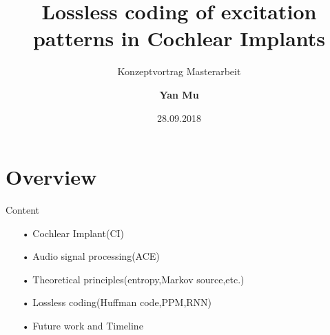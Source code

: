 \documentclass[notes=hide]{beamer}
\title{Lossless coding of excitation patterns in Cochlear Implants}
\author[Yan Mu, B.Eng.]{\textbf{Yan Mu}}
\subtitle{Konzeptvortrag Masterarbeit}
\institute{Institut für Informationsverarbeitung\\ Leibniz Universität Hannover}
\date{28.09.2018}
\begin{document}

\newpage
\section{Overview}
\begin{frame}
	
   \begin{block}{Content}
   	\begin{itemize}	
		\item [•] Cochlear Implant(CI)
		\item [•] Audio signal processing(ACE)
		\item [•] Theoretical principles(entropy,Markov source,etc.)
		\item [•] Lossless coding(Huffman code,PPM,RNN)
		\item [•] Future work and Timeline
   	\end{itemize}
   \end{block}
\end{frame}   
		

\newpage
\end{document}
